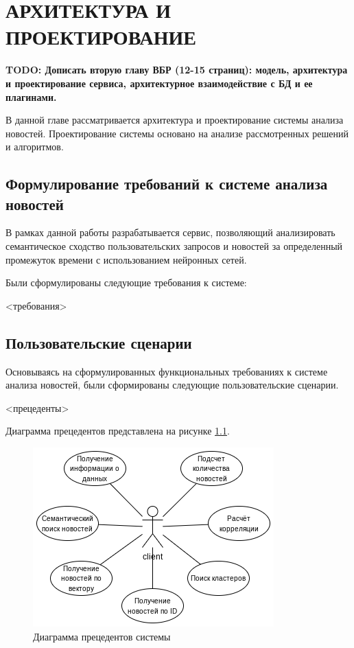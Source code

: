 \chapter{АРХИТЕКТУРА И ПРОЕКТИРОВАНИЕ}

\textbf{TODO: Дописать вторую главу ВБР (12-15 страниц): модель, архитектура и проектирование сервиса, архитектурное взаимодействие с БД и ее плагинами.}


В данной главе рассматривается архитектура и проектирование системы анализа новостей. Проектирование системы основано на анализе рассмотренных решений и алгоритмов.

\section{Формулирование требований к системе анализа новостей}
В рамках данной работы разрабатывается сервис, позволяющий анализировать семантическое сходство пользовательских запросов и новостей за определенный промежуток времени с использованием нейронных сетей.

Были сформулированы следующие требования к системе:

<требования>

\section{Пользовательские сценарии}
Основываясь на сформулированных функциональных требованиях к системе анализа новостей, были сформированы следующие пользовательские сценарии.

<прецеденты>

Диаграмма прецедентов представлена на рисунке \ref{img:use-case-diagram}.

\begin{figure}[h]
    \centering
    \includegraphics{images/use-case-diagram.png}
    \caption{Диаграмма прецедентов системы}
    \label{img:use-case-diagram}
\end{figure}


